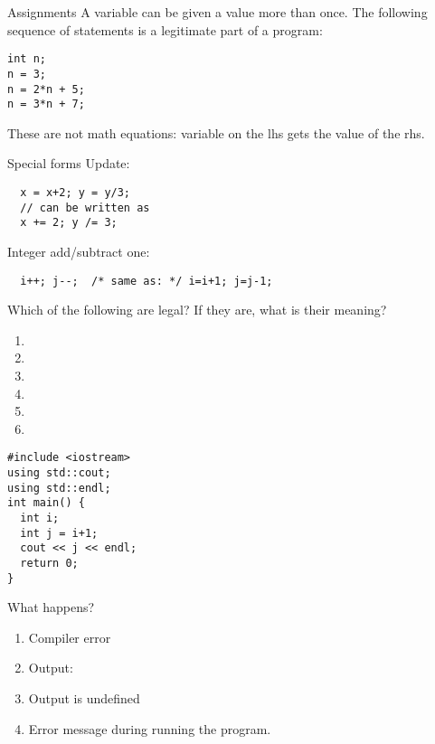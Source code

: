 \begin{block}{Assignments}
  \label{sl:assign2}
  A variable can be given a value more than once. The following
  sequence of statements is a legitimate part of a program:
\begin{lstlisting}
int n;
n = 3;
n = 2*n + 5;
n = 3*n + 7;
\end{lstlisting}
These are not math equations: variable on the lhs gets the value of
the rhs.
\end{block}

\begin{block}{Special forms}
  \label{sl:special-assign}
  Update:
\begin{lstlisting}
  x = x+2; y = y/3;
  // can be written as
  x += 2; y /= 3;
\end{lstlisting}
Integer add/subtract one:
\begin{lstlisting}
  i++; j--;  /* same as: */ i=i+1; j=j-1;
\end{lstlisting}
\end{block}

\begin{exercise}
  \label{q:assign}
  Which of the following are legal? If they are, what is their meaning?
  \begin{enumerate}
  \item {}
  \item {}
  \item {}
  \item {}
  \item {}
  \item {}
  \end{enumerate}
\end{exercise}

\begin{exercise}
  \label{q:initvar}
\begin{lstlisting}
#include <iostream>
using std::cout;
using std::endl;
int main() {
  int i;
  int j = i+1;
  cout << j << endl;
  return 0;
}
\end{lstlisting}
What happens?
\begin{enumerate}
\item Compiler error
\item Output: 
\item Output is undefined
\item Error message during running the program.
\end{enumerate}
\end{exercise}

